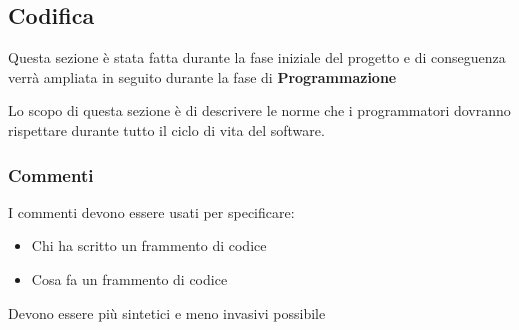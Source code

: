 \subsection{Codifica}

Questa sezione è stata fatta durante la fase iniziale del progetto e di conseguenza verrà ampliata in seguito durante la fase di \textbf{Programmazione}

Lo scopo di questa sezione è di descrivere le norme che i programmatori dovranno rispettare durante tutto il ciclo di vita del software. 

\subsubsection{Commenti}
I commenti devono essere usati per specificare:
\begin{itemize}
\item Chi ha scritto un frammento di codice
\item Cosa fa un frammento di codice

\end{itemize}
Devono essere più sintetici e meno invasivi possibile

